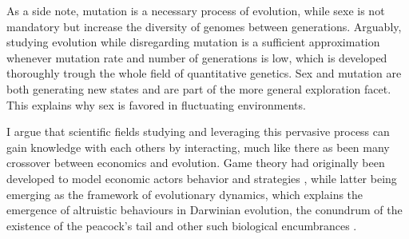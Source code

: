 As a side note, mutation is a necessary process of evolution, while sexe is not mandatory but increase the diversity of genomes between generations.
Arguably, studying evolution while disregarding mutation is a sufficient approximation whenever mutation rate and number of generations is low, which is developed thoroughly trough the whole field of quantitative genetics.
Sex and mutation are both generating new states and are part of the more general exploration facet.
This explains why sex is favored in fluctuating environments.

I argue that scientific fields studying and leveraging this pervasive process can gain knowledge with each others by interacting, much like there as been many crossover between economics and evolution.
Game theory had originally been developed to model economic actors behavior and strategies \citep{VonNeumann1947}, while latter being emerging as the framework of evolutionary dynamics, which explains the emergence of altruistic behaviours in Darwinian evolution, the conundrum of the existence of the peacock's tail and other such biological encumbrances \citep{Smith1973, Smith1982, Nowak2006}.
